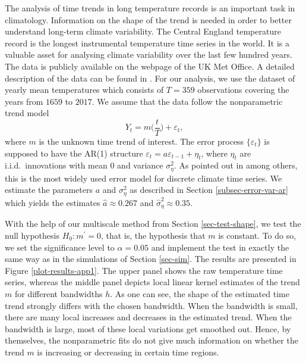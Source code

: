 \documentclass[a4paper,12pt]{article}
\begin{document}
\enlargethispage{0.2cm}
The analysis of time trends in long temperature records is an important task in climatology. Information on the shape of the trend is needed in order to better understand long-term climate variability. The Central England temperature record is the longest instrumental temperature time series in the world. It is a valuable asset for analysing climate variability over the last few hundred years. The data is publicly available on the webpage of the UK Met Office. A detailed description of the data can be found in \cite{Parker1992}. For our analysis, we use the dataset of yearly mean temperatures which consists of $T=359$ observations covering the years from $1659$ to $2017$. We assume that the data follow the nonparametric trend model 
\[ Y_t = m\Big(\frac{t}{T}\Big) + \varepsilon_t, \]
where $m$ is the unknown time trend of interest. The error process $\{ \varepsilon_t \}$ is supposed to have the AR(1) structure $\varepsilon_t = a \varepsilon_{t-1} + \eta_t$, where $\eta_t$ are i.i.d.\ innovations with mean $0$ and variance $\sigma_\eta^2$. As pointed out in \cite{Mudelsee2010} among others, this is the most widely used error model for discrete climate time series. We estimate the parameters $a$ and $\sigma_\eta^2$ as described in Section \ref{subsec-error-var-ar} which yields the estimates $\widehat{a} \approx 0.267$ and $\widehat{\sigma}_\eta^2 \approx 0.35$.


With the help of our multiscale method from Section \ref{sec-test-shape}, we test the null hypothesis $H_0: m^\prime = 0$, that is, the hypothesis that $m$ is constant. To do so, we set the significance level to $\alpha = 0.05$ and implement the test in exactly the same way as in the simulations of Section \ref{sec-sim}. The results are presented in Figure \ref{plot-results-app1}. The upper panel shows the raw temperature time series, whereas the middle panel depicts local linear kernel estimates of the trend $m$ for different bandwidths $h$. As one can see, the shape of the estimated time trend strongly differs with the chosen bandwidth. When the bandwidth is small, there are many local increases and decreases in the estimated trend. When the bandwidth is large, most of these local variations get smoothed out. Hence, by themselves, the nonparametric fits do not give much information on whether the trend $m$ is increasing or decreasing in certain time regions. 
\end{document}
